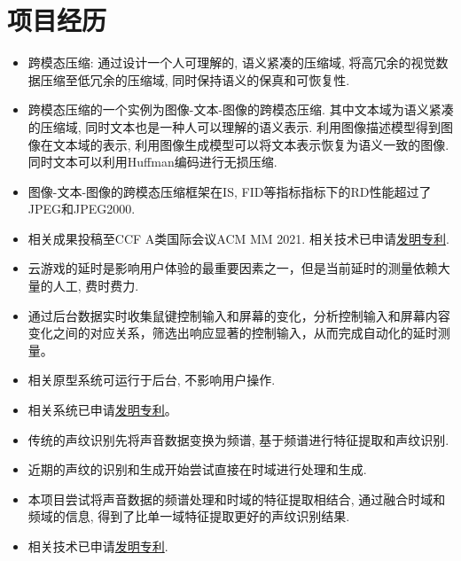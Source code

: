 \documentclass{resume}
\begin{document}
\section{项目经历}
\begin{itemize}
  \item 跨模态压缩: 通过设计一个人可理解的, 语义紧凑的压缩域, 将高冗余的视觉数据压缩至低冗余的压缩域, 同时保持语义的保真和可恢复性. 
  \item 跨模态压缩的一个实例为图像-文本-图像的跨模态压缩. 其中文本域为语义紧凑的压缩域, 同时文本也是一种人可以理解的语义表示. 利用图像描述模型得到图像在文本域的表示, 利用图像生成模型可以将文本表示恢复为语义一致的图像. 同时文本可以利用Huffman编码进行无损压缩. 
  \item 图像-文本-图像的跨模态压缩框架在IS, FID等指标指标下的RD性能超过了JPEG和JPEG2000.
  \item 相关成果投稿至CCF A类国际会议ACM MM 2021. 相关技术已申请\href{http://www.soopat.com/Patent/202010604773}{发明专利}.
\end{itemize}
\begin{itemize}
  \item 云游戏的延时是影响用户体验的最重要因素之一，但是当前延时的测量依赖大量的人工, 费时费力.
  \item 通过后台数据实时收集鼠键控制输入和屏幕的变化，分析控制输入和屏幕内容变化之间的对应关系，筛选出响应显著的控制输入，从而完成自动化的延时测量。
  \item 相关原型系统可运行于后台, 不影响用户操作.
  \item 相关系统已申请\href{http://www.soopat.com/Patent/202110172567}{发明专利}。
\end{itemize}
\begin{itemize}
  \item 传统的声纹识别先将声音数据变换为频谱, 基于频谱进行特征提取和声纹识别.
  \item 近期的声纹的识别和生成开始尝试直接在时域进行处理和生成.
  \item 本项目尝试将声音数据的频谱处理和时域的特征提取相结合, 通过融合时域和频域的信息, 得到了比单一域特征提取更好的声纹识别结果.
  \item 相关技术已申请\href{http://www.soopat.com/Patent/202010694750}{发明专利}.
\end{itemize}
\end{document}
